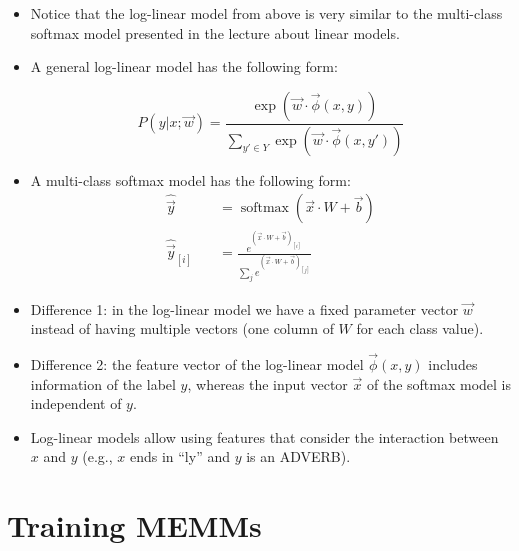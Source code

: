 \begin{itemize}
\item Notice that the log-linear model from above is very similar to the multi-class softmax model presented in the lecture about linear models.

\item A general log-linear model has the following form:

\begin{displaymath}
 P( y | x; \vec{w}) = \frac{\exp (\vec{w}\cdot \vec{\phi}(x,y))}{\sum_{y' \in Y} \exp (\vec{w}\cdot \vec{\phi}(x,y'))}
\end{displaymath}


\item A multi-class softmax model has the following form:
\begin{equation}
\begin{split}
\hat{\vec{y}} \quad & =  \operatorname{softmax}(\vec{x} \cdot W + \vec{b})  \\
\hat{\vec{y}}_{[i]} \quad & = \frac{e^{(\vec{x} \cdot W + \vec{b})_{[i]}}}{\sum_j e^{(\vec{x} \cdot W + \vec{b})_{[j]}}}
\end{split}
\end{equation}

 
\item Difference 1: in the log-linear model we have a fixed parameter vector $\vec{w}$ instead of having multiple vectors (one column of $W$ for each class value).

\item Difference 2: the feature vector of the log-linear model $\vec{\phi}(x,y)$ includes information of the label $y$, whereas the input vector $\vec{x}$ of the softmax model is independent of $y$. 

\item Log-linear models allow using features that consider the interaction between $x$ and $y$ (e.g., $x$ ends in ``ly'' and $y$ is an ADVERB).

 
\end{itemize}



\section{Training MEMMs}

